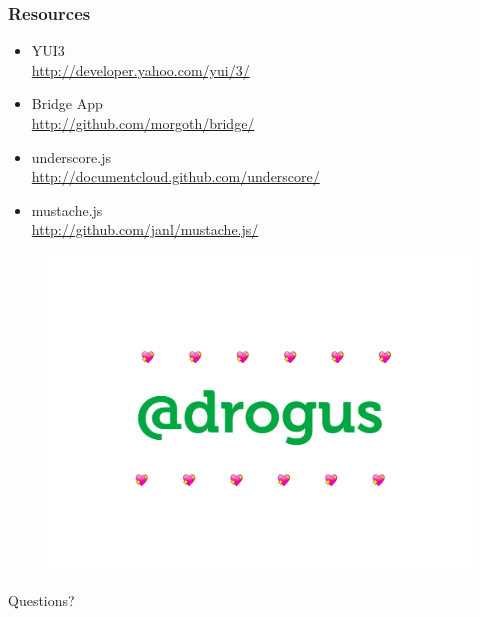 \documentclass[16pt]{beamer}
\begin{document}
\begin{frame}
  \frametitle{Resources}
  \begin{itemize}
  \item YUI3 \\\url{http://developer.yahoo.com/yui/3/}
  \item Bridge App \\\url{http://github.com/morgoth/bridge/}
  \item underscore.js \\\url{http://documentcloud.github.com/underscore/}
  \item mustache.js \\\url{http://github.com/janl/mustache.js/}
  \end{itemize}
\end{frame}

\begin{frame}
  \begin{figure}
    \includegraphics[width=\linewidth]{drogus.png}
  \end{figure}
\end{frame}

\begin{frame}
  \begin{center}
    \Huge{Questions?}
  \end{center}
\end{frame}
\end{document}
